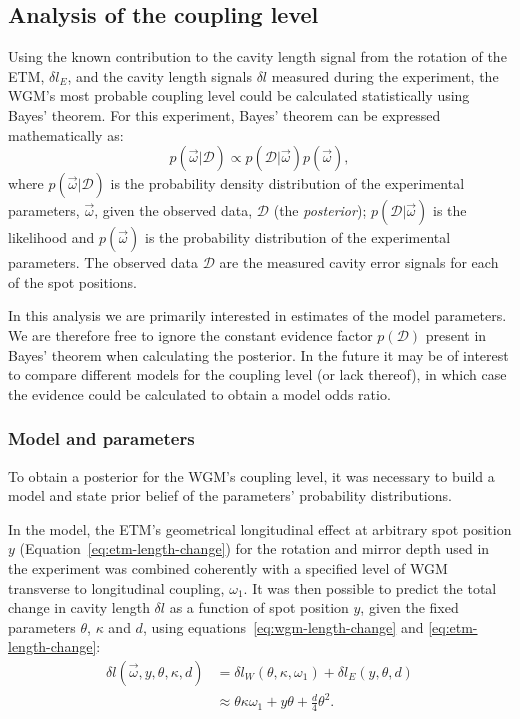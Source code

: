 \subsection{Analysis of the coupling level}
\label{sec:simulations}
Using the known contribution to the cavity length signal from the rotation of the \gls{ETM}, $\delta l_E$, and the cavity length signals $\delta l$ measured during the experiment, the \gls{WGM}'s most probable coupling level could be calculated statistically using Bayes' theorem. For this experiment, Bayes' theorem can be expressed mathematically as:
\begin{equation}
  p \left( \vec{\omega} | \mathcal{D} \right) \propto p \left( \mathcal{D} | \vec{\omega} \right) p \left( \vec{\omega} \right),
  \label{eq:bayes}
\end{equation}
where $p \left( \vec{\omega} | \mathcal{D} \right)$ is the probability density distribution of the experimental parameters, $\vec{\omega}$, given the observed data, $\mathcal{D}$ (the \emph{posterior}); $p \left( \mathcal{D} | \vec{\omega} \right)$ is the likelihood and $p \left( \vec{\omega} \right)$ is the probability distribution of the experimental parameters. The observed data $\mathcal{D}$ are the measured cavity error signals for each of the spot positions.

In this analysis we are primarily interested in estimates of the model parameters. We are therefore free to ignore the constant evidence factor $p \left( \mathcal{D} \right)$ present in Bayes' theorem when calculating the posterior. In the future it may be of interest to compare different models for the coupling level (or lack thereof), in which case the evidence could be calculated to obtain a model odds ratio.

\subsubsection{Model and parameters}
To obtain a posterior for the \gls{WGM}'s coupling level, it was necessary to build a model and state prior belief of the parameters' probability distributions.

In the model, the \gls{ETM}'s geometrical longitudinal effect at arbitrary spot position $y$ (Equation~\ref{eq:etm-length-change}) for the rotation and mirror depth used in the experiment was combined coherently with a specified level of \gls{WGM} transverse to longitudinal coupling, $\omega_1$. It was then possible to predict the total change in cavity length $\delta l$ as a function of spot position $y$, given the fixed parameters $\theta$, $\kappa$ and $d$, using equations~\ref{eq:wgm-length-change} and \ref{eq:etm-length-change}:
\begin{equation}
  \begin{split}
    \delta l \left( \vec{\omega}, y, \theta, \kappa, d \right) & = \delta l_W \left( \theta, \kappa, \omega_1 \right) + \delta l_E \left( y, \theta, d \right) \\
    & \approx \theta \kappa \omega_1 + y \theta + \frac{d}{4} \theta^2.
  \end{split}
\end{equation}

